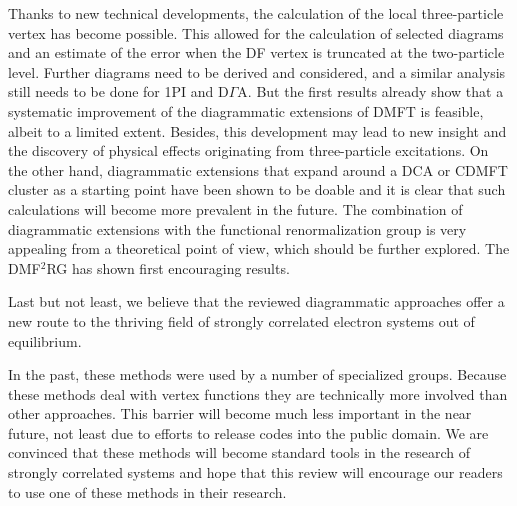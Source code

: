 \documentclass[rmp,aps,reprint,amsmath,amssymb,superscriptaddress,showpacs,nofootinbib]{revtex4-1}
\begin{document}
Thanks to  new technical developments, the calculation of the local three-particle vertex has become possible. This allowed for the calculation of selected diagrams and  an estimate of the error when the DF vertex is truncated at the two-particle level. Further diagrams need to be derived and considered, and a similar analysis still needs to be done for 1PI and D$\Gamma$A. But the first results already show that a systematic improvement of the diagrammatic extensions of DMFT is feasible, albeit  to a limited extent. Besides, this development may lead to new insight and the discovery of physical effects originating from three-particle excitations. On the other hand, diagrammatic extensions that expand around a DCA or CDMFT cluster as a starting point have been shown to be doable and it is clear that such calculations will become more prevalent in the future. The combination of diagrammatic extensions with the functional renormalization group is very appealing from a theoretical point of view, which should be further explored. The DMF$^2$RG has shown first encouraging results.

Last but not least, we believe that the reviewed diagrammatic approaches offer a new route to the thriving field of  strongly correlated electron systems out of equilibrium.

In the past, these methods were used by a number of specialized groups. Because these methods deal with vertex functions they are technically more involved than other approaches. This barrier will become much less important in the near future, not least due to efforts to release codes into the public domain. We are convinced that these methods will become standard tools in the research of strongly correlated systems and hope that this review will encourage our readers to use one of these methods in their research.
\end{document}
